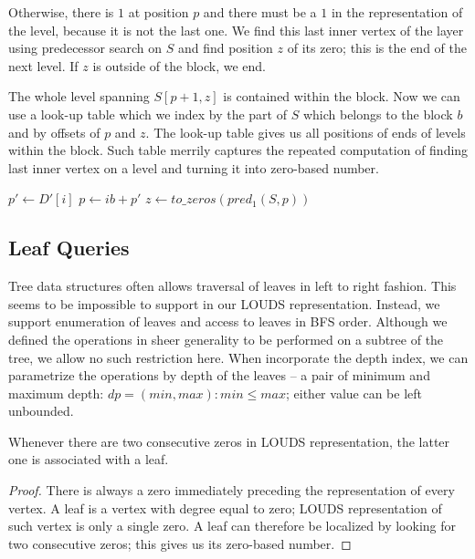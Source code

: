 Otherwise, there is $1$ at position $p$ and there must be a $1$ in the representation of the level, because it is not the last one.
We find this last inner vertex of the layer using predecessor search on $S$ and find position $z$ of its zero; this is the end of the next level.
If $z$ is outside of the block, we end.

The whole level spanning $S[p+1, z]$ is contained within the block.
Now we can use a look-up table which we index by the part of $S$ which belongs to the block $b$ and by offsets of $p$ and $z$.
The look-up table gives us all positions of ends of levels within the block.
Such table merrily captures the repeated computation of finding last inner vertex on a level and turning it into zero-based number.

\begin{algorithmic}
	\State $p' \gets D'[i]$
	 
		\State {}
	\Else
		\State $p \gets i b + p'$
		 
			\State {} 
		\Else
			\State $z \gets to\_zeros(pred_1(S, p))$
			 
				\State {}
			\Else
				\State {}
			\EndIf
		\EndIf
	\EndIf
\EndFunction
\end{algorithmic}

\subsection{\label{ss:leaf-queries}Leaf Queries}

Tree data structures often allows traversal of leaves in left to right fashion.
This seems to be impossible to support in our LOUDS representation.
Instead, we support enumeration of leaves and access to leaves in BFS order.
Although we defined the operations in sheer generality to be performed on a subtree of the tree, we allow no such restriction here.
When incorporate the depth index, we can parametrize the operations by depth of the leaves -- a pair of minimum and maximum depth: $dp = (min, max): min \le max$; either value can be left unbounded.

\begin{lemma}
	Whenever there are two consecutive zeros in LOUDS representation, the latter one is associated with a leaf.
\end{lemma}
\begin{proof}
	There is always a zero immediately preceding the representation of every vertex.
	A leaf is a vertex with degree equal to zero; LOUDS representation of such vertex is only a single zero.
	A leaf can therefore be localized by looking for two consecutive zeros; this gives us its zero-based number.
\end{proof}

